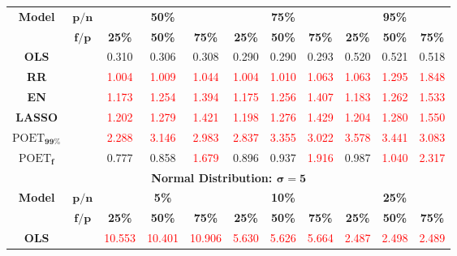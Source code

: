 \begin{table}[ht!]
{\begin{tabular*}{\textwidth}{@{\extracolsep{\fill}}ccccccccccc@{}}
\midrule
\multirow{2}{*}{\textbf{Model}} & $\bm{p/n}$ & \multicolumn{3}{c}{\textbf{50\%}} & \multicolumn{3}{c}{\textbf{75\%}} & \multicolumn{3}{c}{\textbf{95\%}} \\
\cmidrule{3-5}
\cmidrule{6-8}
\cmidrule{9-11}
\multirow{2}{*}{} & $\bm{f/p}$ & \textbf{25\%} & \textbf{50\%} & \textbf{75\%} & \textbf{25\%} & \textbf{50\%} & \textbf{75\%} & \textbf{25\%} & \textbf{50\%} & \textbf{75\%} \\
\midrule
\textbf{OLS} &  & 0.310 & 0.306 & 0.308 & 0.290 & 0.290 & 0.293 & 0.520 & 0.521 & 0.518 \\
\textbf{RR} &  & \textcolor{red}{1.004} & \textcolor{red}{1.009} & \textcolor{red}{1.044} & \textcolor{red}{1.004} & \textcolor{red}{1.010} & \textcolor{red}{1.063} & \textcolor{red}{1.063} & \textcolor{red}{1.295} & \textcolor{red}{1.848} \\
\textbf{EN} &  & \textcolor{red}{1.173} & \textcolor{red}{1.254} & \textcolor{red}{1.394} & \textcolor{red}{1.175} & \textcolor{red}{1.256} & \textcolor{red}{1.407} & \textcolor{red}{1.183} & \textcolor{red}{1.262} & \textcolor{red}{1.533} \\
\textbf{LASSO} &  & \textcolor{red}{1.202} & \textcolor{red}{1.279} & \textcolor{red}{1.421} & \textcolor{red}{1.198} & \textcolor{red}{1.276} & \textcolor{red}{1.429} & \textcolor{red}{1.204} & \textcolor{red}{1.280} & \textcolor{red}{1.550} \\
\textbf{$\text{POET}_{\bm{99\%}}$} &  & \textcolor{red}{2.288} & \textcolor{red}{3.146} & \textcolor{red}{2.983} & \textcolor{red}{2.837} & \textcolor{red}{3.355} & \textcolor{red}{3.022} & \textcolor{red}{3.578} & \textcolor{red}{3.441} & \textcolor{red}{3.083} \\
\textbf{$\text{POET}_{\bm{f}}$} &  & 0.777 & 0.858 & \textcolor{red}{1.679} & 0.896 & 0.937 & \textcolor{red}{1.916} & 0.987 & \textcolor{red}{1.040} & \textcolor{red}{2.317} \\
\midrule
\multicolumn{11}{c}{\textbf{Normal Distribution: $\bm\sigma=\textbf{5}$}}\\
\midrule
\multirow{2}{*}{\textbf{Model}} & $\bm{p/n}$ & \multicolumn{3}{c}{\textbf{5\%}} & \multicolumn{3}{c}{\textbf{10\%}} & \multicolumn{3}{c}{\textbf{25\%}} \\
\cmidrule{3-5}
\cmidrule{6-8}
\cmidrule{9-11}
\multirow{2}{*}{} & $\bm{f/p}$ & \textbf{25\%} & \textbf{50\%} & \textbf{75\%} & \textbf{25\%} & \textbf{50\%} & \textbf{75\%} & \textbf{25\%} & \textbf{50\%} & \textbf{75\%} \\
\midrule
\textbf{OLS} &  & \textcolor{red}{10.553} & \textcolor{red}{10.401} & \textcolor{red}{10.906} & \textcolor{red}{5.630} & \textcolor{red}{5.626} & \textcolor{red}{5.664} & \textcolor{red}{2.487} & \textcolor{red}{2.498} & \textcolor{red}{2.489} \\

\end{tabular*}}
\end{table}
